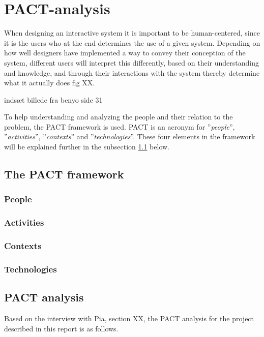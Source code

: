 \section{PACT-analysis}\label{sec:PACT}
When designing an interactive system it is important to be human-centered, since it is the users who at the end determines the use of a given system.
Depending on how well designers have implemented a way to convey their conception of the system, different users will interpret this differently, based on their understanding and knowledge, and through their interactions with the system thereby determine what it actually does {\color{red}fig XX}.

{\color{red}indsæt billede fra benyo side 31}

To help understanding and analyzing the people and their relation to the problem, the PACT framework is used.
PACT is an acronym for ''{\itshape{people}}'', ''{\itshape{activities}}'', ''{\itshape{contexts}}'' and ''{\itshape{technologies}}''.
These four elements in the framework will be explained further in the subsection \ref{sec:PACT-framework} below.

\subsection{The PACT framework}\label{sec:PACT-framework}
\subsubsection*{People}

\subsubsection*{Activities}

\subsubsection*{Contexts}

\subsubsection*{Technologies}


\subsection{PACT analysis}\label{sec:PACT-analysis}
Based on the interview
with Pia,
{\color{red} section XX}, the PACT analysis for the project described in this report is as follows.

